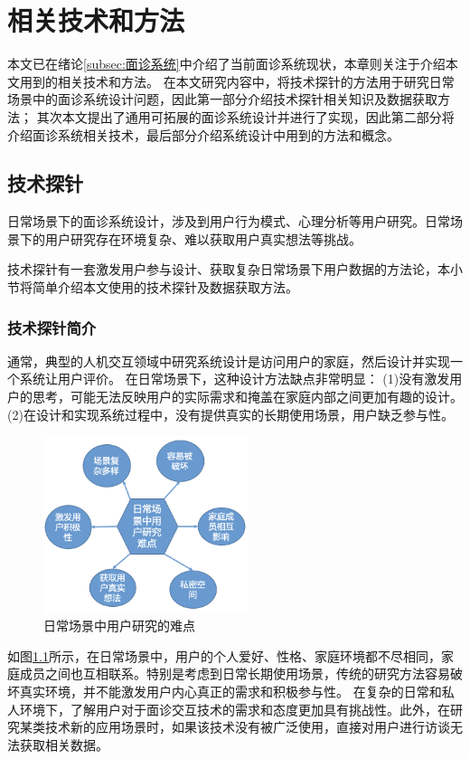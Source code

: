 \chapter{相关技术和方法}
本文已在绪论\ref{subsec:面诊系统}中介绍了当前面诊系统现状，本章则关注于介绍本文用到的相关技术和方法。
在本文研究内容中，将技术探针的方法用于研究日常场景中的面诊系统设计问题，因此第一部分介绍技术探针相关知识及数据获取方法；
其次本文提出了通用可拓展的面诊系统设计并进行了实现，因此第二部分将介绍面诊系统相关技术，最后部分介绍系统设计中用到的方法和概念。

\section{技术探针}
日常场景下的面诊系统设计，涉及到用户行为模式、心理分析等用户研究。日常场景下的用户研究存在环境复杂、难以获取用户真实想法等挑战。

技术探针有一套激发用户参与设计、获取复杂日常场景下用户数据的方法论，本小节将简单介绍本文使用的技术探针及数据获取方法。

\subsection{技术探针简介}

通常，典型的人机交互领域中研究系统设计是访问用户的家庭，然后设计并实现一个系统让用户评价。
在日常场景下，这种设计方法缺点非常明显\cite{Hutchinson2003Technology}：
(1)没有激发用户的思考，可能无法反映用户的实际需求和掩盖在家庭内部之间更加有趣的设计。
(2)在设计和实现系统过程中，没有提供真实的长期使用场景，用户缺乏参与性。

\begin{figure}[h]
    \centering
    \includegraphics[width=6cm]{images/user_study_hard.png}
    \caption{日常场景中用户研究的难点}
    \label{fig:user_study_hard}
\end{figure}

如图\ref{fig:user_study_hard}所示，在日常场景中，用户的个人爱好、性格、家庭环境都不尽相同，家庭成员之间也互相联系。特别是考虑到日常长期使用场景，传统的研究方法容易破坏真实环境，并不能激发用户内心真正的需求和积极参与性。
在复杂的日常和私人环境下，了解用户对于面诊交互技术的需求和态度更加具有挑战性。此外，在研究某类技术新的应用场景时，如果该技术没有被广泛使用，直接对用户进行访谈无法获取相关数据。

